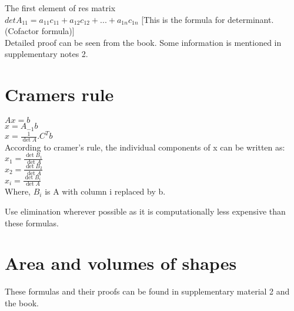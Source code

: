 \documentclass[]{article}
\begin{document}
\noindent
The first element of res matrix\\

\noindent
$detA_{11}=a_{11}c_{11}+a_{12}c_{12}+...+a_{1n}c_{1n}$ [This is the formula for determinant.(Cofactor formula)]\\

\noindent
Detailed proof can be seen from the book. Some information is mentioned in supplementary notes 2.\\

\vspace{10pt}

\section{Cramers rule}

\vspace{10pt}

$Ax=b$\\
$x=A_{-1}b$\\

\noindent
$x=\frac{1}{\det{A}}.C^Tb$\\

\noindent
According to cramer's rule, the individual components of x can be written as:\\

\noindent
$x_1=\frac{\det{B_1}}{\det{A}}$\\

\noindent
$x_2=\frac{\det{B_2}}{\det{A}}$\\

\noindent
$x_i=\frac{\det{B_i}}{\det{A}}$\\

\noindent
Where, $B_i$ is A with column i replaced by b.\\

\begin{mytheorem}[title=Note]
	Use elimination wherever possible as it is computationally less expensive than these formulas.
\end{mytheorem}

\vspace{10pt}

\section{Area and volumes of shapes}
These formulas and their proofs can be found in supplementary material 2 and the book.\\
\end{document}
